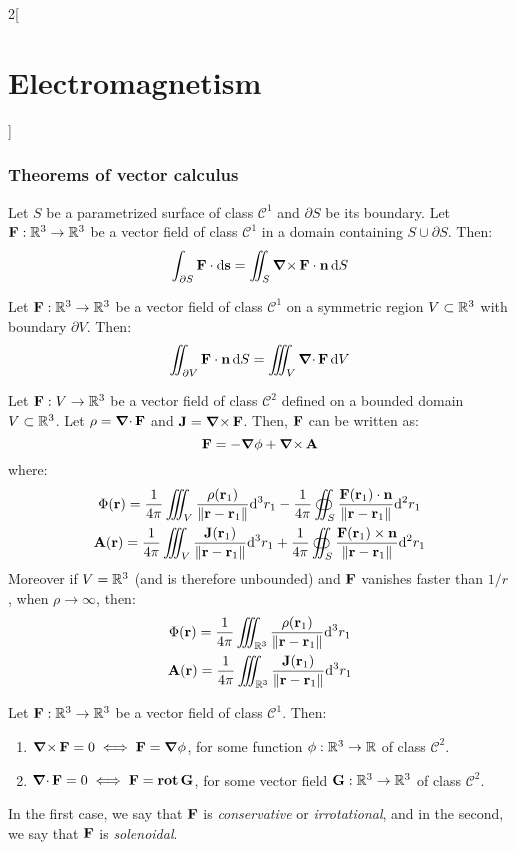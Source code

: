 \documentclass[../../../main_physics.tex]{subfiles}
\begin{document}
\begin{multicols}{2}[\section{Electromagnetism}]
  \subsubsection{Theorems of vector calculus}
  \begin{theorem}
    Let $S$ be a parametrized surface of class $\mathcal{C}^1$ and $\partial S$ be its boundary. Let $\vf{F}:\RR^3\rightarrow\RR^3$ be a vector field of class $\mathcal{C}^1$ in a domain containing $S\cup\partial S$. Then: $$\int_{\partial S}\vf{F}\cdot \dd{\vf{s}}=\iint_S\rotp\vf{F}\cdot\vf{n} \dd{S}$$
  \end{theorem}
  \begin{theorem}
    Let $\vf{F}:\RR^3\rightarrow\RR^3$ be a vector field of class $\mathcal{C}^1$ on a symmetric region $V\subset\RR^3$ with boundary $\partial V$. Then: $$\iint_{\partial V}\vf{F}\cdot\vf{n} \dd{S}=\iiint_V\divp\vf{F}\dd{V}$$
  \end{theorem}
  \begin{theorem}
    Let $\vf{F}:V\rightarrow\RR^3$ be a vector field of class $\mathcal{C}^2$ defined on a bounded domain $V\subset\RR^3$. Let $\rho=\divp\vf{F}$ and $\vf{J}=\rotp\vf{F}$. Then, $\vf{F}$ can be written as: $$\vf{F}=-\grad\phi+\rotp\vf{A}$$
    where:
    \begin{gather*}
      \Phi(\vf{r}) =\frac 1 {4\pi} \iiint_V \frac{\rho(\vf{r}_1)}{\norm{\vf{r}-\vf{r}_1}}\dd^3r_1 -\frac 1 {4\pi} \oiint_S\frac{\vf{F} (\vf{r}_1)\cdot\vf{n}}{\norm{\vf{r}-\vf{r}_1}}\dd^2r_1\\
      \vf{A}(\vf{r}) =\frac 1 {4\pi} \iiint_V \frac{\vf{J}(\vf{r}_1)}{\norm{\vf{r}-\vf{r}_1}}\dd^3r_1 +\frac 1 {4\pi} \oiint_S \frac{\vf{F} (\vf{r}_1)\times\vf{n}}{\norm{\vf{r}-\vf{r}_1}}\dd^2r_1
    \end{gather*}
    Moreover if $V=\RR^3$ (and is therefore unbounded) and $\vf{F}$ vanishes faster than $1/r$, when $\rho\to\infty$, then:
    \begin{gather*}
      \Phi(\vf{r}) =\frac 1 {4\pi} \iiint_{\RR^3} \frac{\rho(\vf{r}_1)}{\norm{\vf{r}-\vf{r}_1}}\dd^3r_1 \\
      \vf{A}(\vf{r}) =\frac 1 {4\pi} \iiint_{\RR^3} \frac{\vf{J}(\vf{r}_1)}{\norm{\vf{r}-\vf{r}_1}}\dd^3r_1
    \end{gather*}
  \end{theorem}
  \begin{theorem}
    Let $\vf{F}:\RR^3\rightarrow\RR^3$ be a vector field of class $\mathcal{C}^1$. Then:
    \begin{enumerate}
      \item $\rotp\vf{F}=0\iff\vf{F}=\grad\phi$, for some function $\phi:\RR^3\rightarrow\RR$ of class $\mathcal{C}^2$.
      \item $\divp\vf{F}=0\iff\vf{F}=\rot\vf{G}$, for some vector field $\vf{G}:\RR^3\rightarrow\RR^3$ of class $\mathcal{C}^2$.
    \end{enumerate}
    In the first case, we say that $\vf{F}$ is \emph{conservative} or \emph{irrotational}, and in the second, we say that $\vf{F}$ is \emph{solenoidal}.
  \end{theorem}

\end{multicols}
\end{document}

